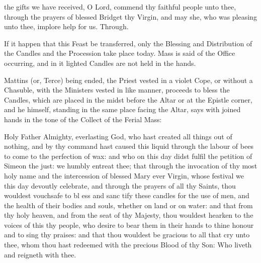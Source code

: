
\postcommunion\label{BridgetPostcommmunion}
 the gifts we have received, O Lord, commend thy faithful people unto thee, through the prayers of blessed Bridget thy Virgin, and may she, who was pleasing unto thee, implore help for us. Through.


\clearpage
{}

\begin{rubric}
    If it happen that this Feast be transferred, only the Blessing and Distribution of the Candles and the Procession take place today. Mass is said of the Office occurring, and in it lighted Candles are not held in the hands.
\end{rubric}

\begin{rubric}
    Mattins (or, Terce) being ended, the Priest vested in a violet Cope, or without a Chasuble, with the Ministers vested in like manner, proceeds to bless the Candles, which are placed in the midst before the Altar or at the Epistle corner, and he himself, standing in the same place facing the Altar, says with joined hands in the tone of the Collect of the Ferial Mass:
\end{rubric}
{} Holy Father Almighty, everlasting God, who hast created all things out of nothing, and by thy command hast caused this liquid through the labour of bees to come to the perfection of wax: and who on this day didst fulfil the petition of Simeon the just: we humbly entreat thee; that through the invocation of thy most holy name and the intercession of blessed Mary ever Virgin, whose festival we this day devoutly celebrate, and through the prayers of all thy Saints, thou wouldest vouchsafe to bl {} ess and sanc {} tify these candles for the use of men, and the health of their bodies and souls, whether on land or on water: and that from thy holy heaven, and from the seat of thy Majesty, thou wouldest hearken to the voices of this thy people, who desire to bear them in their hands to thine honour and to sing thy praises: and that thou wouldest be gracious to all that cry unto thee, whom thou hast redeemed with the precious Blood of thy Son: Who liveth and reigneth with thee.\\


